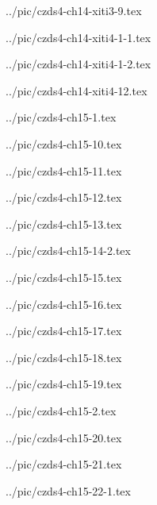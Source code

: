 ../pic/czds4-ch14-xiti3-9.tex



../pic/czds4-ch14-xiti4-1-1.tex



../pic/czds4-ch14-xiti4-1-2.tex



../pic/czds4-ch14-xiti4-12.tex



../pic/czds4-ch15-1.tex



../pic/czds4-ch15-10.tex



../pic/czds4-ch15-11.tex



../pic/czds4-ch15-12.tex



../pic/czds4-ch15-13.tex



../pic/czds4-ch15-14-2.tex



../pic/czds4-ch15-15.tex



../pic/czds4-ch15-16.tex



../pic/czds4-ch15-17.tex



../pic/czds4-ch15-18.tex



../pic/czds4-ch15-19.tex



../pic/czds4-ch15-2.tex



../pic/czds4-ch15-20.tex



../pic/czds4-ch15-21.tex



../pic/czds4-ch15-22-1.tex

